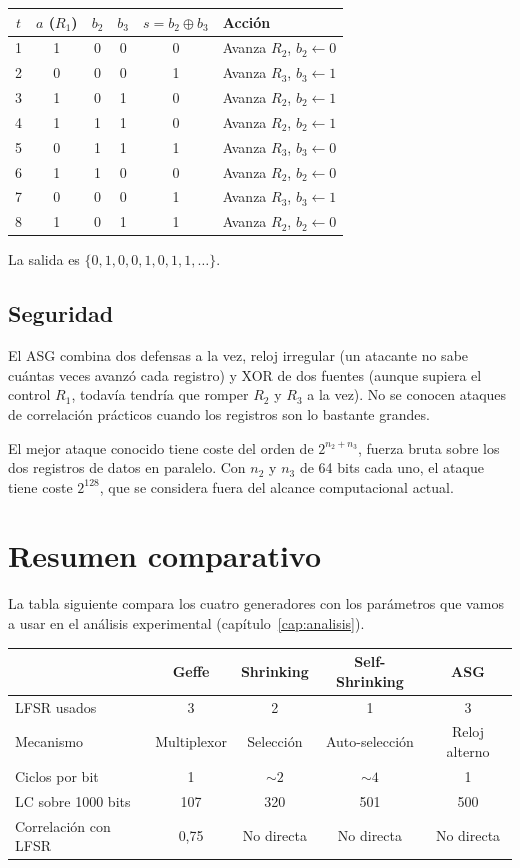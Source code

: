 \begin{center}
\begin{tabular}{c|c|cc|c|l}
\hline
$t$ & $a$ ($R_1$) & $b_2$ & $b_3$ & $s = b_2 \oplus b_3$ & Acción \\
\hline
1 & 1 & 0 & 0 & 0 & Avanza $R_2$, $b_2 \leftarrow 0$ \\
2 & 0 & 0 & 0 & 1 & Avanza $R_3$, $b_3 \leftarrow 1$ \\
3 & 1 & 0 & 1 & 0 & Avanza $R_2$, $b_2 \leftarrow 1$ \\
4 & 1 & 1 & 1 & 0 & Avanza $R_2$, $b_2 \leftarrow 1$ \\
5 & 0 & 1 & 1 & 1 & Avanza $R_3$, $b_3 \leftarrow 0$ \\
6 & 1 & 1 & 0 & 0 & Avanza $R_2$, $b_2 \leftarrow 0$ \\
7 & 0 & 0 & 0 & 1 & Avanza $R_3$, $b_3 \leftarrow 1$ \\
8 & 1 & 0 & 1 & 1 & Avanza $R_2$, $b_2 \leftarrow 0$ \\
\hline
\end{tabular}
\end{center}

La salida es $\{0, 1, 0, 0, 1, 0, 1, 1, \ldots\}$.

\subsection{Seguridad}

El ASG combina dos defensas a la vez, reloj irregular (un atacante no sabe cuántas veces avanzó cada registro)
y XOR de dos fuentes (aunque supiera el control $R_1$, todavía tendría que romper $R_2$ y $R_3$ a la vez).
No se conocen ataques de correlación prácticos cuando los registros son lo bastante grandes.

El mejor ataque conocido tiene coste del orden de $2^{n_2 + n_3}$,
fuerza bruta sobre los dos registros de datos en paralelo.
Con $n_2$ y $n_3$ de 64 bits cada uno, el ataque tiene coste $2^{128}$, que se considera fuera del alcance computacional actual.

\section{Resumen comparativo}

La tabla siguiente compara los cuatro generadores con los parámetros que vamos a usar en el análisis experimental (capítulo~\ref{cap:analisis}).

\begin{center}
\begin{tabular}{l|cccc}
\hline
& Geffe & Shrinking & Self-Shrinking & ASG \\
\hline
LFSR usados & 3 & 2 & 1 & 3 \\
Mecanismo & Multiplexor & Selección & Auto-selección & Reloj alterno \\
Ciclos por bit & 1 & $\sim 2$ & $\sim 4$ & 1 \\
LC sobre 1000 bits & 107 & 320 & 501 & 500 \\
Correlación con LFSR & 0,75 & No directa & No directa & No directa \\
\hline
\end{tabular}
\end{center}

